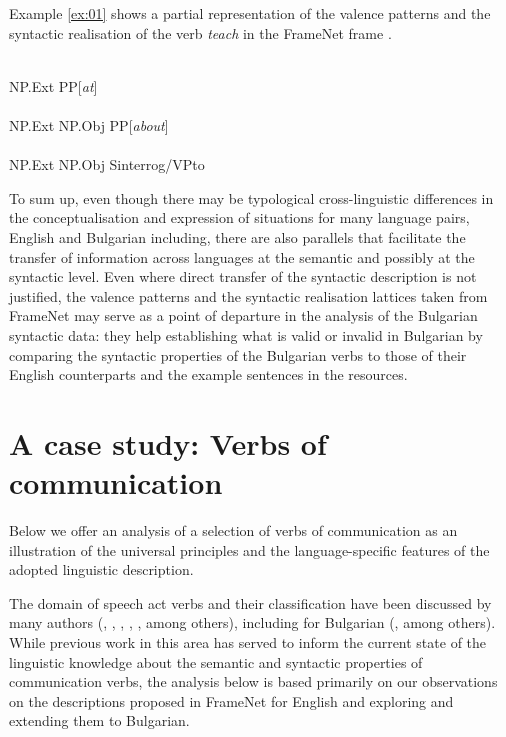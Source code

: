 \documentclass[output=paper,colorlinks,citecolor=brown]{langscibook}
\begin{document}
Example \ref{ex:01} shows a partial representation of the valence patterns and the syntactic realisation of the verb \textit{teach} in the FrameNet frame .

\begin{exe}
 \ex  \label{ex:01}
     \begin{xlist}
         \ex \gll {} \\
NP.Ext PP[\textit{at}] \\
         \ex \gll {}  \\
NP.Ext NP.Obj PP[\textit{about}] \\
         \ex \gll {}  \\
NP.Ext NP.Obj Sinterrog/VPto \\
     \end{xlist}
\end{exe}
 

To sum up, even though there may be typological cross-linguistic differences in the conceptualisation and expression of situations for many language pairs, English and Bulgarian including, there are also parallels that facilitate the transfer of information across languages at the semantic and possibly at the syntactic level. Even where direct transfer of the syntactic description is not justified, the valence patterns and the syntactic realisation lattices taken from FrameNet may serve as a point of departure in the analysis of the Bulgarian syntactic data: they help establishing what is valid or invalid in Bulgarian by comparing the syntactic properties of the Bulgarian verbs to those of their English counterparts and the example sentences in the resources.   

\section{A case study: Verbs of communication}\label{sec:communication}

Below we offer an analysis of a selection of verbs of communication as an illustration of the universal principles and the language-specific features of the adopted linguistic description. 

The domain of speech act verbs and their classification have been discussed by many authors (\cite{Wierzbicka1987}, \cite[202--211]{Levin1993}, \cite{Levin-et-al1997}, \cite{UrbanRuppenhofer2001}, \cite{Boas2010}, among others), including for Bulgarian (\cite{Nitsolova2008kompl,Penchev1998,Tisheva2000,Tisheva2004vapros,Koeva2021kompl}, among others). While previous work in this area has served to inform the current state of the linguistic knowledge about the semantic and syntactic properties of communication verbs, the analysis below is based primarily on our observations on the descriptions proposed in FrameNet for English and exploring and extending them to Bulgarian. 
\end{document}
